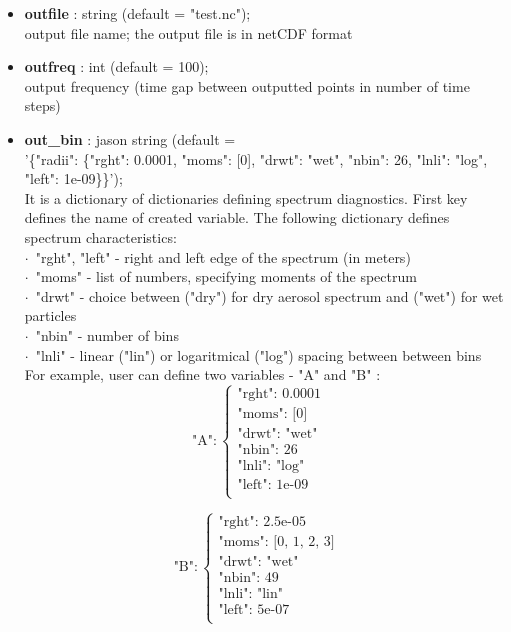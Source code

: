 \documentclass[11pt]{article}
\begin{document}
\begin{itemize}
  \item \textbf{outfile} : string (default = "test.nc"); \\ output file name; the output file is in netCDF format
  \item \textbf{outfreq} : int (default = 100); \\ output frequency (time gap between outputted points in number of time steps)
  \item \textbf{out\_bin} : jason string (default =\\ '\{"radii": \{"rght": 0.0001, "moms": [0], "drwt": "wet", "nbin": 26, "lnli": "log", "left": 1e-09\}\}');\\

    \vspace{-.9em}
    It is a dictionary of dictionaries defining spectrum diagnostics.
    First key defines the name of created variable. The following dictionary defines spectrum characteristics:\\
      \indent $\cdot$\ "rght", "left" - right and left edge of the spectrum (in meters)\\
      \indent $\cdot$\ "moms" - list of numbers, specifying moments of the spectrum\\
      \indent $\cdot$\ "drwt" - choice between  ("dry") for dry aerosol spectrum and ("wet") for wet particles\\
      \indent $\cdot$\ "nbin" - number of bins\\
      \indent $\cdot$\ "lnli" - linear ("lin") or logaritmical ("log") spacing between between bins\\
 
    \vspace{-.9em}
    For example, user can define two variables - "A" and "B" : \\ 
  
$$
\mbox{"A"}: \left\{ \begin{array}{ll}
\mbox{"rght": 0.0001}  & \textrm{}\\
\mbox{"moms": [0]}  & \textrm{}\\
\mbox{"drwt": "wet"} & \textrm{}\\
\mbox{"nbin": 26} & \textrm{}\\
\mbox{"lnli": "log"}  & \textrm{}\\
\mbox{"left": 1e-09} & \textrm{}\\
\end{array} \right.
$$

$$
\mbox{"B"}: \left\{ \begin{array}{ll}
\mbox{"rght": 2.5e-05} & \textrm{}\\
\mbox{"moms": [0, 1, 2, 3] } & \textrm{}\\
\mbox{"drwt": "wet"} & \textrm{}\\
\mbox{"nbin": 49} & \textrm{}\\
\mbox{"lnli": "lin"} & \textrm{}\\
\mbox{"left": 5e-07} & \textrm{}\\
\end{array} \right.
$$
 

\end{itemize}
\end{document}
